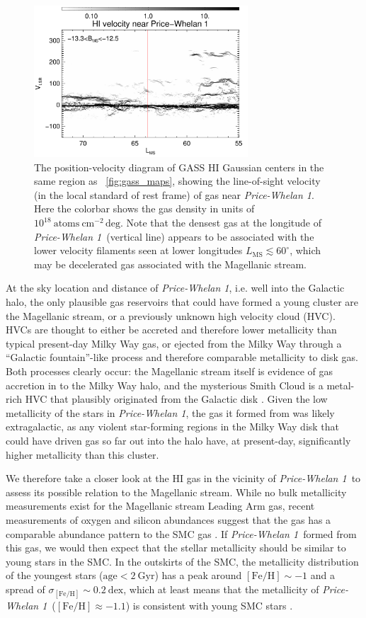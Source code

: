 \documentclass[twocolumn]{aastex62}
\newcommand{\feh}{\ensuremath{[\textrm{Fe} / \textrm{H}]}}
\newcommand{\hi}{H{\footnotesize I} }
\newcommand{\clustername}{\textsl{Price-Whelan 1}}
\begin{document}
\begin{figure}[t]
\centering
\includegraphics[width=8cm]{figures/gass_vlsrmlon.pdf}
\caption{The position-velocity diagram of GASS \hi Gaussian centers in the same region as \figurename~\ref{fig:gass_maps}, showing the line-of-sight velocity (in the local standard of rest frame) of gas near \clustername.
Here the colorbar shows the gas density in units of $10^{18}~\textrm{atoms}~\textrm{cm}^{-2}\,\textrm{deg}$.
Note that the densest gas at the longitude of \clustername\ (vertical line) appears to be associated with the lower velocity filaments seen at lower longitudes $L_{\textrm{MS}} \lesssim 60^\circ$, which may be decelerated gas associated with the Magellanic stream.
}
\label{fig:gasspv}
\end{figure}

At the sky location and distance of \clustername, i.e. well into the Galactic halo, the only plausible gas reservoirs that could have formed a young cluster are the Magellanic stream, or a previously unknown high velocity cloud (HVC).
HVCs are thought to either be accreted and therefore lower metallicity than typical present-day Milky Way gas, or ejected from the Milky Way through a ``Galactic fountain''-like process and therefore comparable metallicity to disk gas.
Both processes clearly occur: the Magellanic stream itself is evidence of gas accretion in to the Milky Way halo, and the mysterious Smith Cloud \citep{Smith:1963} is a metal-rich \citep[$\feh \sim 0.5$][]{Fox:2016} HVC that plausibly originated from the Galactic disk \citep[e.g.,][]{Bregman:1980}.
Given the low metallicity of the stars in \clustername, the gas it formed from was likely extragalactic, as any violent star-forming regions in the Milky Way disk that could have driven gas so far out into the halo have, at present-day, significantly higher metallicity than this cluster.

We therefore take a closer look at the \hi gas in the vicinity of \clustername\ to assess its possible relation to the Magellanic stream.
While no bulk metallicity measurements exist for the Magellanic stream Leading Arm gas, recent measurements of oxygen and silicon abundances suggest that the gas has a comparable abundance pattern to the SMC gas \citep{Fox:2018, Richter:2018}.
If \clustername\ formed from this gas, we would then expect that the stellar metallicity should be similar to young stars in the SMC.
In the outskirts of the SMC, the metallicity distribution of the youngest stars ($\textrm{age} < 2~\textrm{Gyr}$) has a peak around $\feh \sim -1$ and a spread of $\sigma_{\feh} \sim 0.2~\textrm{dex}$, which at least means that the metallicity of \clustername\ ($\feh \approx -1.1$) is consistent with young SMC stars \citep{Dobbie:2014}.
\end{document}
